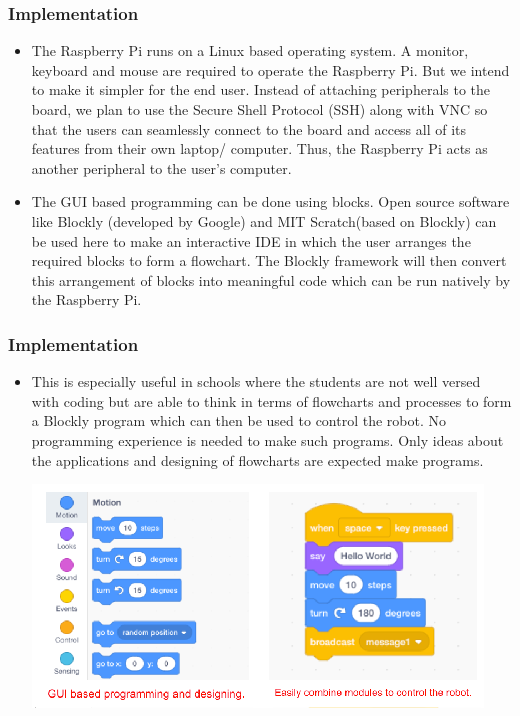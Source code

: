 \documentclass{beamer}
\begin{document}
\begin{frame}
\frametitle{Implementation}
\begin{center}
\justifying
\begin{itemize}
\item The Raspberry Pi runs on a Linux based operating system. A monitor, keyboard and mouse are required to operate the Raspberry Pi. But we intend to make it simpler for the end user. Instead of attaching peripherals to the board, we plan to use the Secure Shell Protocol (SSH) along with VNC so that the users can seamlessly connect to the board and access all of its features from their own laptop/ computer. Thus, the Raspberry Pi acts as another peripheral to the user’s computer.

\item The GUI based programming can be done using blocks. Open source software like Blockly (developed by Google) and MIT Scratch(based on Blockly) can be used here to make an interactive IDE in which the user arranges the required blocks to form a flowchart. The Blockly framework will then convert this arrangement of blocks into meaningful code which can be run natively by the Raspberry Pi. 
\end{itemize}
\end{center}
\end{frame}   

\begin{frame}
\frametitle{Implementation}
\begin{center}
\justifying
\begin{itemize}
\item This is especially useful in schools where the students are not well versed with coding but are able to think in terms of flowcharts and processes to form a Blockly program which can then be used to control the robot. No programming experience is needed to make such programs. Only ideas about the applications and designing of flowcharts are expected make programs.

\includegraphics[height=.5\textheight]{Images/one.png}

\end{itemize}
\end{center}
\end{frame} 
\end{document}
